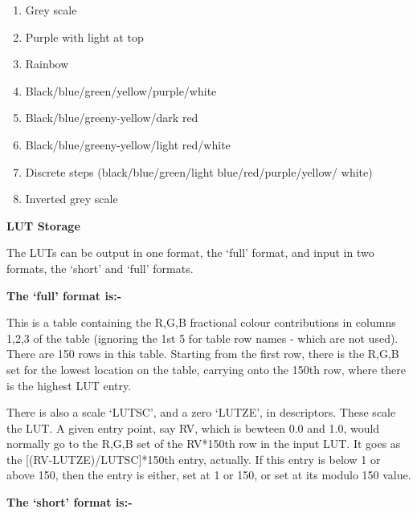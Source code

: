 \begin{small}
{{\begin{enumerate}
   \item Grey scale
   \item Purple with light at top
   \item Rainbow
   \item Black/blue/green/yellow/purple/white
   \item Black/blue/greeny-yellow/dark red
   \item Black/blue/greeny-yellow/light red/white
   \item Discrete steps (black/blue/green/light blue/red/purple/yellow/
                       white)
   \item Inverted grey scale
\end{enumerate}                                                              
                                                                              
\vspace*{1mm}
{\bf LUT Storage}
\vspace*{1mm}

  The LUTs can be output in one format, the `full' format, and input
  in two formats, the `short' and `full' formats.
                                                                              
  {\bf The `full' format is:-}
                                                                              
  This is a table containing the R,G,B fractional colour contributions
  in columns 1,2,3 of the table (ignoring the 1st 5 for table row
  names - which are not used). There are 150 rows in this table.
  Starting from the first row, there is the R,G,B set for the lowest
  location on the table, carrying onto the 150th row, where there is
  the highest LUT entry.
                                                                              
  There is also a scale `LUTSC', and a zero `LUTZE', in descriptors.
  These scale the LUT. A given entry point, say RV, which is
  bewteen 0.0 and 1.0, would normally go to the R,G,B set of the
  RV*150th row in the input LUT. It goes as
  the [(RV-LUTZE)/LUTSC]*150th entry, actually. If this entry is below 1 or
  above 150, then the entry is either, set at 1 or 150, or set at
  its modulo 150 value.
                                                                              
  {\bf The `short' format is:-}
                                                                              
}}
\end{small}
